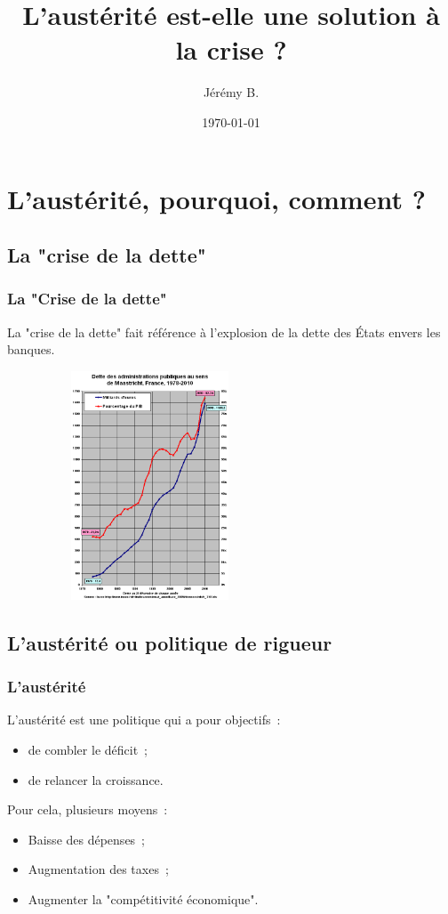 \documentclass[t]{beamer}
\date{\today}
\author{Jérémy B.}
\title{L'austérité est-elle une solution à la crise ?}
\begin{document}
\frame{\titlepage}


\begin{frame}
\tableofcontents
\end{frame}

\section{L'austérité, pourquoi, comment ?}
\subsection{La "crise de la dette"}
\begin{frame}
	\frametitle{La "Crise de la dette"}
	La "crise de la dette" fait référence à l'explosion de la dette des \'Etats envers les banques.
	\pause
	
	\begin{center}
	\includegraphics[width=8.5cm, height=6.8cm]{image/dette.png}
	\end{center}
	
\end{frame}

\subsection{L'austérité ou politique de rigueur}
\begin{frame}
\frametitle{L'austérité}
L'austérité est une politique qui a pour objectifs~:
\begin{itemize}
	\item de combler le déficit~;
	\pause
	\item de relancer la croissance.
	\pause
\end{itemize}

Pour cela, plusieurs moyens~:
\begin{itemize}
	\item Baisse des dépenses~;
	\pause
	\item Augmentation des taxes~;
	\pause
	\item Augmenter la "compétitivité économique".
\end{itemize}
\end{frame}
\end{document}
